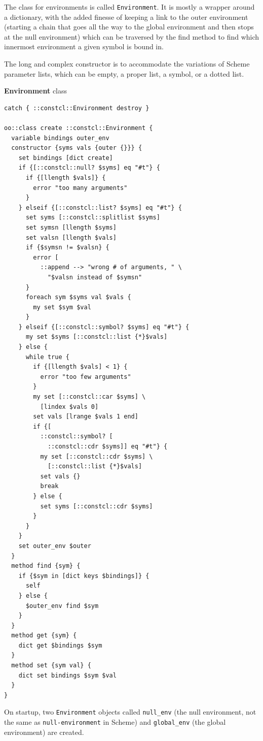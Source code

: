 \documentclass[twoside,9pt]{report}
\begin{document}
The class for environments is called \texttt{Environment}. It is mostly a wrapper around a dictionary, with the added finesse of keeping a link to the outer environment (starting a chain that goes all the way to the global environment and then stops at the null environment) which can be traversed by the find method to find which innermost environment a given symbol is bound in.


The long and complex constructor is to accommodate the variations of Scheme parameter lists, which can be empty, a proper list, a symbol, or a dotted list.


\textbf{Environment} class

\noindent\makebox[\linewidth]{\rule{\linewidth}{0.4pt}}
\begin{lstlisting}
catch { ::constcl::Environment destroy }
 
oo::class create ::constcl::Environment {
  variable bindings outer_env
  constructor {syms vals {outer {}}} {
    set bindings [dict create]
    if {[::constcl::null? $syms] eq "#t"} {
      if {[llength $vals]} {
        error "too many arguments"
      }
    } elseif {[::constcl::list? $syms] eq "#t"} {
      set syms [::constcl::splitlist $syms]
      set symsn [llength $syms]
      set valsn [llength $vals]
      if {$symsn != $valsn} {
        error [
          ::append --> "wrong # of arguments, " \
            "$valsn instead of $symsn"
      }
      foreach sym $syms val $vals {
        my set $sym $val
      }
    } elseif {[::constcl::symbol? $syms] eq "#t"} {
      my set $syms [::constcl::list {*}$vals]
    } else {
      while true {
        if {[llength $vals] < 1} {
          error "too few arguments"
        }
        my set [::constcl::car $syms] \
          [lindex $vals 0]
        set vals [lrange $vals 1 end]
        if {[
          ::constcl::symbol? [
            ::constcl::cdr $syms]] eq "#t"} {
          my set [::constcl::cdr $syms] \
            [::constcl::list {*}$vals]
          set vals {}
          break
        } else {
          set syms [::constcl::cdr $syms]
        }
      }
    }
    set outer_env $outer
  }
  method find {sym} {
    if {$sym in [dict keys $bindings]} {
      self
    } else {
      $outer_env find $sym
    }
  }
  method get {sym} {
    dict get $bindings $sym
  }
  method set {sym val} {
    dict set bindings $sym $val
  }
}
\end{lstlisting}
\noindent\makebox[\linewidth]{\rule{\linewidth}{0.4pt}}

On startup, two \texttt{Environment} objects called \texttt{null\_env} (the null environment, not the same as \texttt{null-environment} in Scheme) and \texttt{global\_env} (the global environment) are created.
\end{document}
